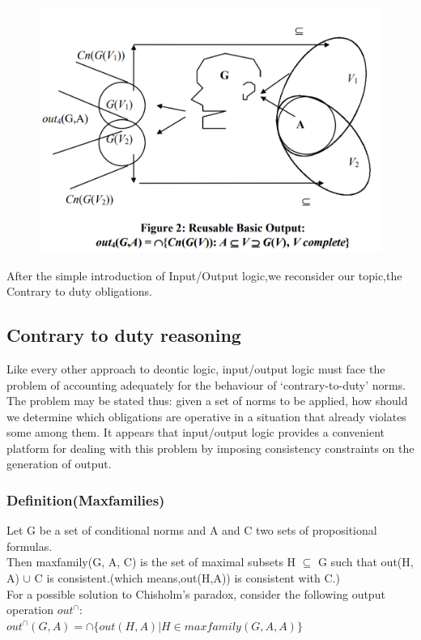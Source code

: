 \documentclass{article}
\begin{document}
\begin{figure}[hb]
\centering
\includegraphics[scale=0.5]{out4.png}

\label{fig_framework}
\end{figure}
After the simple introduction of Input/Output logic,we reconsider our topic,the Contrary to duty obligations.
\subsection{Contrary to duty reasoning}
Like every other approach to deontic logic, input/output logic must face the problem of accounting adequately for the behaviour of  ‘contrary-to-duty’ norms. The problem may be stated thus: given a set of norms to be applied, how
should we determine which obligations are operative in a situation that already
violates some among them. It appears that input/output logic provides a convenient platform for dealing with this problem by imposing consistency constraints on the generation of output.
\subsubsection{Definition(Maxfamilies)}
Let G be a set of conditional norms and A and C two sets of propositional formulas.\\
Then maxfamily(G, A, C) is the set of maximal
subsets H $\subseteq$ G such that out(H, A) $\cup$ C is consistent.(which means,out(H,A)) is consistent with C.)\\
For a possible solution to Chisholm’s paradox, consider the following output operation $out^{\cap}$:\\
$out^{\cap}(G, A) = \cap
\{out(H, A) | H \in maxfamily(G, A, A)\}
$
\end{document}

